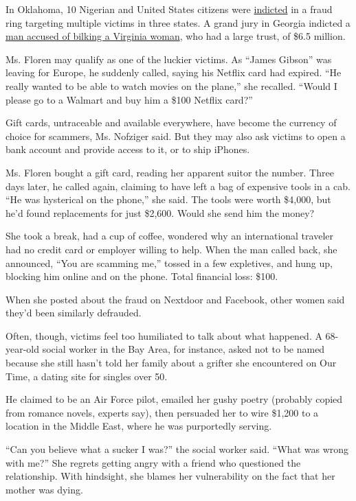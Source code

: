 In Oklahoma, 10 Nigerian and United States citizens were
\href{https://www.justice.gov/opa/pr/10-men-involved-nigerian-romance-scams-indicted-money-laundering-conspiracy}{indicted}
in a fraud ring targeting multiple victims in three states. A grand jury
in Georgia indicted a
\href{https://www.justice.gov/usao-ndga/pr/georgia-man-indicted-65-million-dollar-online-romance-scam-and-business-email}{man
accused of bilking a Virginia woman}, who had a large trust, of \$6.5
million.

Ms. Floren may qualify as one of the luckier victims. As ``James
Gibson'' was leaving for Europe, he suddenly called, saying his Netflix
card had expired. ``He really wanted to be able to watch movies on the
plane,'' she recalled. ``Would I please go to a Walmart and buy him a
\$100 Netflix card?''

Gift cards, untraceable and available everywhere, have become the
currency of choice for scammers, Ms. Nofziger said. But they may also
ask victims to open a bank account and provide access to it, or to ship
iPhones.

Ms. Floren bought a gift card, reading her apparent suitor the number.
Three days later, he called again, claiming to have left a bag of
expensive tools in a cab. ``He was hysterical on the phone,'' she said.
The tools were worth \$4,000, but he'd found replacements for just
\$2,600. Would she send him the money?

She took a break, had a cup of coffee, wondered why an international
traveler had no credit card or employer willing to help. When the man
called back, she announced, ``You are scamming me,'' tossed in a few
expletives, and hung up, blocking him online and on the phone. Total
financial loss: \$100.

When she posted about the fraud on Nextdoor and Facebook, other women
said they'd been similarly defrauded.

Often, though, victims feel too humiliated to talk about what happened.
A 68-year-old social worker in the Bay Area, for instance, asked not to
be named because she still hasn't told her family about a grifter she
encountered on Our Time, a dating site for singles over 50.

He claimed to be an Air Force pilot, emailed her gushy poetry (probably
copied from romance novels, experts say), then persuaded her to wire
\$1,200 to a location in the Middle East, where he was purportedly
serving.

``Can you believe what a sucker I was?'' the social worker said. ``What
was wrong with me?'' She regrets getting angry with a friend who
questioned the relationship. With hindsight, she blames her
vulnerability on the fact that her mother was dying.

